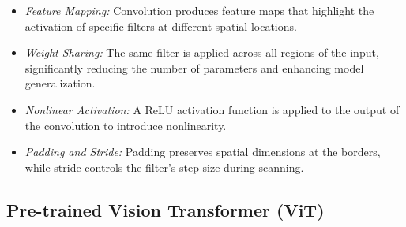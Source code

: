 \documentclass[conference]{IEEEtran}
\begin{document}
\begin{itemize}
    \item \textit{Feature Mapping:} Convolution produces feature maps that highlight the activation of specific filters at different spatial locations.
    \item \textit{Weight Sharing:} The same filter is applied across all regions of the input, significantly reducing the number of parameters and enhancing model generalization.
    \item \textit{Nonlinear Activation:} A ReLU activation function is applied to the output of the convolution to introduce nonlinearity.
    \item \textit{Padding and Stride: }Padding preserves spatial dimensions at the borders, while stride controls the filter’s step size during scanning.
\end{itemize}

\subsection{Pre-trained Vision Transformer (ViT)}
\end{document}
